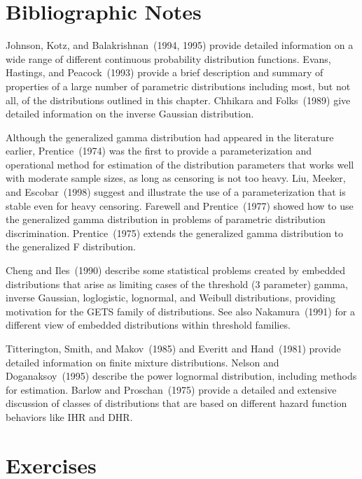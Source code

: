 \section*{Bibliographic Notes}
Johnson, Kotz, and Balakrishnan~(1994, 1995) provide detailed
information on a wide range of different continuous probability
distribution functions.  Evans, Hastings, and Peacock~(1993) provide
a brief description and summary of properties of a large number of
parametric distributions including most, but not all, of the
distributions outlined in this chapter.  Chhikara and Folks~(1989)
give detailed information on the inverse Gaussian distribution.

Although the generalized gamma distribution had appeared in the
literature earlier, Prentice~(1974) was the first to provide a
parameterization and operational method for estimation of the distribution
parameters that works well with moderate sample sizes, as long as
censoring is not too heavy. Liu, Meeker, and Escobar~(1998) suggest
and illustrate the use of a parameterization that is stable even for
heavy censoring.  Farewell and Prentice~(1977) showed how to use the
generalized gamma distribution in problems of parametric distribution
discrimination.  Prentice~(1975) extends the generalized gamma
distribution to the generalized F distribution.  

Cheng and Iles~(1990)
describe some statistical problems created by embedded
distributions that arise as limiting cases of the threshold (3 parameter)
gamma, inverse Gaussian, loglogistic, lognormal, and Weibull
distributions, providing motivation for the GETS family of
distributions. See also Nakamura~(1991) for a different view of
embedded distributions within threshold families.

Titterington, Smith, and Makov~(1985) and Everitt and Hand~(1981)
provide detailed information on finite mixture distributions. Nelson
and Doganaksoy~(1995) describe the power lognormal distribution,
including methods for estimation. Barlow and Proschan~(1975) provide a
detailed and extensive discussion of classes of distributions that are
based on different hazard function behaviors like IHR and DHR.



\section*{Exercises}

